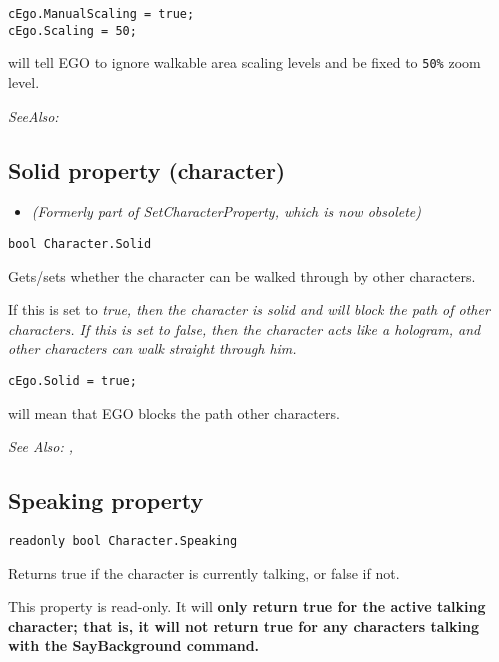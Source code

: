 \begin{verbatim}
cEgo.ManualScaling = true;
cEgo.Scaling = 50;
\end{verbatim}
will tell EGO to ignore walkable area scaling levels and be fixed to \verb$50%$ zoom level.

\it{SeeAlso:} 


\subsection{Solid property (character)}\label{Character.Solid}%

\begin{itemize}
\item \it{(Formerly part of SetCharacterProperty, which is now obsolete)}
\end{itemize}

\begin{verbatim}
bool Character.Solid
\end{verbatim}
Gets/sets whether the character can be walked through by other characters.

If this is set to \it{true}, then the character is solid and will block the path of other
characters. If this is set to \it{false}, then the character acts like a hologram, and other
characters can walk straight through him.

\begin{verbatim}
cEgo.Solid = true;
\end{verbatim}
will mean that EGO blocks the path other characters.

\it{See Also:} ,


\subsection{Speaking property}\label{Character.Speaking}%

\begin{verbatim}
readonly bool Character.Speaking
\end{verbatim}
Returns true if the character is currently talking, or false if not.

This property is read-only. It will \bf{only} return true for the active talking character;
that is, it will not return true for any characters talking with the SayBackground command.

